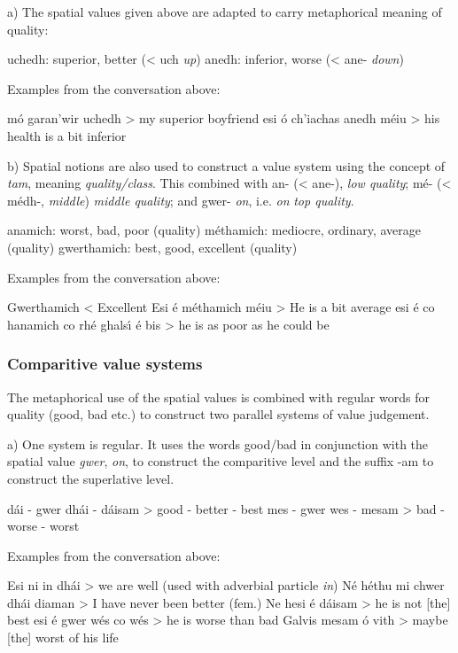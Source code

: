 a) The spatial values given above are adapted to carry metaphorical meaning of quality:

        uchedh: superior, better (< uch \textit{up})
         anedh: inferior, worse (< ane- \textit{down})

Examples from the conversation above:

m\'{o} garan'wir uchedh > my superior boyfriend
esi \'{o} ch'iachas anedh m\'{e}iu > his health is a bit inferior

b) Spatial notions are also used to construct a value system using the concept of \textit{tam}, meaning \textit{quality/class}. This combined with an- (< ane-), \textit{low quality}; m\'{e}- (< m\'{e}dh-, \textit{middle}) \textit{middle quality}; and gwer- \textit{on}, i.e. \textit{on} \textit{top quality}.

         anamich: worst, bad, poor (quality) 
        m\'{e}thamich: mediocre, ordinary, average (quality) 
        gwerthamich: best, good, excellent (quality) 

Examples from the conversation above:

Gwerthamich < Excellent
Esi \'{e} m\'{e}thamich m\'{e}iu > He is a bit average
esi \'{e} co hanamich co rh\'{e} ghals\'{\i} \'{e} bis > he is as poor as he could be


\subsubsection{Comparitive value systems}

The metaphorical use of the spatial values is combined with regular words for quality (good, bad etc.) to construct two parallel systems of value judgement. 

a) One system is regular. It uses the words good/bad in conjunction with the spatial value \textit{gwer}, \textit{on}, to construct the comparitive level and the suffix -am to construct the superlative level.

        d\'{a}i - gwer dh\'{a}i - d\'{a}isam > good - better - best
        mes - gwer wes - mesam > bad - worse - worst

Examples from the conversation above:

Esi ni in dh\'{a}i > we are well (used with adverbial particle \textit{in})
N\'{e} h\'{e}thu mi chwer dh\'{a}i diaman > I have never been better (fem.)
Ne hesi \'{e} d\'{a}isam > he is not [the] best
esi \'{e} gwer w\'{e}s co w\'{e}s > he is worse than bad
Galvis mesam \'{o} vith > maybe [the] worst of his life


